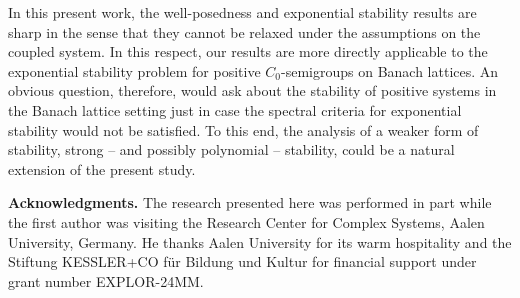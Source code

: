 \documentclass[a4paper,11pt,reqno]{amsart}
\theoremstyle{plain}
\numberwithin{equation}{section}
\begin{document}
In this present work, the well-posedness and exponential stability results are sharp in the sense that they cannot be relaxed under the assumptions on the coupled system. In this respect, our results are more directly applicable to the exponential stability problem for positive $C_0$-semigroups on Banach lattices. An obvious question, therefore, would ask about the stability of positive systems in the Banach lattice setting just in case the spectral criteria for exponential stability would not be satisfied. To this end, the analysis of a weaker form of stability, strong -- and possibly polynomial -- stability, could be a natural extension of the present study.

\bigskip\noindent
\textbf{Acknowledgments.} The research presented here was performed in part while the first author was visiting the Research Center for Complex Systems, Aalen University, Germany. He thanks Aalen University for its warm hospitality and the Stiftung KESSLER+CO für Bildung und Kultur for financial support under grant number EXPLOR-24MM.



\end{document}
